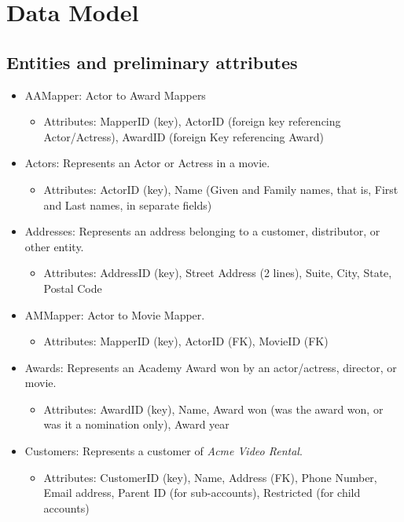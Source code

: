 \documentclass[letterpaper,12pt]{article}
\begin{document}
\section{Data Model}
\subsection{Entities and preliminary attributes}
\begin{itemize}
	\item AAMapper: Actor to Award Mappers
	      \begin{itemize}
		      \item Attributes: MapperID (key), ActorID (foreign key referencing Actor/Actress), AwardID (foreign Key referencing Award)
	      \end{itemize}
	\item Actors: Represents an Actor or Actress in a movie.
	      \begin{itemize}
		      \item Attributes: ActorID (key), Name (Given and Family names, that is, First and Last names, in separate fields)
	      \end{itemize}
	\item Addresses: Represents an address belonging to a customer, distributor, or other entity.
	      \begin{itemize}
		      \item Attributes: AddressID (key), Street Address (2 lines), Suite, City, State, Postal Code
	      \end{itemize}
	\item AMMapper: Actor to Movie Mapper.
	      \begin{itemize}
		      \item Attributes: MapperID (key), ActorID (FK), MovieID (FK)
	      \end{itemize}
	\item Awards: Represents an Academy Award won by an actor/actress, director, or movie.
	      \begin{itemize}
		      \item Attributes: AwardID (key), Name, Award won (was the award won, or was it a nomination only), Award year
	      \end{itemize}
	\item Customers: Represents a customer of \emph{Acme Video Rental}.
	      \begin{itemize}
		      \item Attributes: CustomerID (key), Name, Address (FK), Phone Number, Email address, Parent ID (for sub-accounts), Restricted (for child accounts)

\end{itemize}
\end{itemize}
\end{document}
